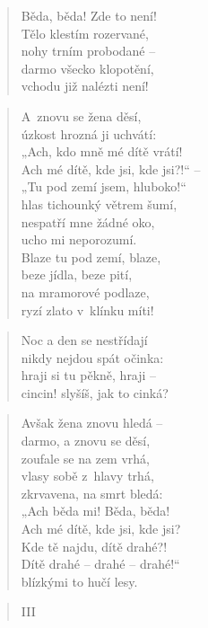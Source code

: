 \begin{verse}
Běda, běda! Zde to není! \\
Tělo klestím rozervané, \\
nohy trním probodané -- \\
darmo všecko klopotění, \\
vchodu již nalézti není!
\end{verse}

\begin{verse}
A~znovu se žena děsí, \\
úzkost hrozná ji uchvátí: \\
„Ach, kdo mně mé dítě vrátí! \\
Ach mé dítě, kde jsi, kde jsi?!“ -- \\
„Tu pod zemí jsem, hluboko!“ \\
hlas tichounký větrem šumí, \\
nespatří mne žádné oko, \\
ucho mi neporozumí. \\
Blaze tu pod zemí, blaze, \\
beze jídla, beze pití, \\
na mramorové podlaze, \\
ryzí zlato v~klínku míti!
\end{verse}

\begin{verse}
Noc a den se nestřídají \\
nikdy nejdou spát očinka: \\
hraji si tu pěkně, hraji -- \\
cincin! slyšíš, jak to cinká?
\end{verse}

\begin{verse}
Avšak žena znovu hledá -- \\
darmo, a znovu se děsí, \\
zoufale se na zem vrhá, \\
vlasy sobě z~hlavy trhá, \\
zkrvavena, na smrt bledá: \\
„Ach běda mi! Běda, běda! \\
Ach mé dítě, kde jsi, kde jsi? \\
Kde tě najdu, dítě drahé?! \\
Dítě drahé -- drahé -- drahé!“ \\
blízkými to hučí lesy.
\end{verse}

\begin{verse}
III
\end{verse}

